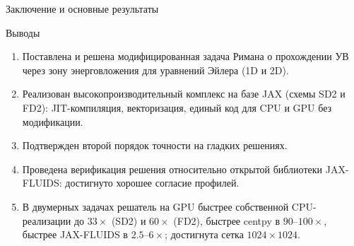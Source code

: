 \documentclass[ignoreonframetext,unicode,aspectratio=169]{beamer}
\begin{document}
%				
%		
	

	\begin{frame}{Заключение и основные результаты}

		\begin{block}{Выводы}
			\begin{enumerate}
				\item Поставлена и решена модифицированная задача Римана о прохождении УВ через зону энерговложения для уравнений Эйлера (1D и 2D).
				\item Реализован высокопроизводительный комплекс на базе JAX (схемы SD2 и FD2): JIT-компиляция, векторизация, единый код для CPU и GPU без модификации.
				\item Подтвержден второй порядок точности на гладких решениях.
				\item Проведена верификация решения относительно открытой библиотеки JAX-FLUIDS: достигнуто хорошее согласие профилей.
				\item В двумерных задачах решатель на GPU быстрее собственной CPU-реализации до $33\times$ (SD2) и $60\times$ (FD2), быстрее centpy в $90$--$100\times$, быстрее JAX-FLUIDS в $2.5$--$6\times$; достигнута сетка $1024\times1024$.
			\end{enumerate}
		\end{block}

	\end{frame}
\end{document}
